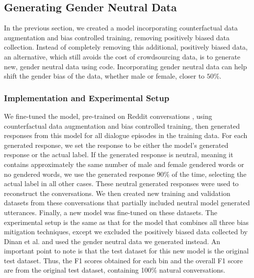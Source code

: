 \subsection{Generating Gender Neutral Data}
In the previous section, we created a model incorporating counterfactual data augmentation and bias controlled training, removing positively biased data collection. Instead of completely removing this additional, positively biased data, an alternative, which still avoids the cost of crowdsourcing data, is to generate new, gender neutral data using code. Incorporating gender neutral data can help shift the gender bias of the data, whether male or female, closer to $50\%$.

\subsubsection{Implementation and Experimental Setup}
We fine-tuned the model, pre-trained on Reddit conversations \supercite{redditmodel}, using counterfactual data augmentation and bias controlled training, then generated responses from this model for all dialogue episodes in the training data. For each generated response, we set the response to be either the model’s generated response or the actual label. If the generated response is neutral, meaning it contains approximately the same number of male and female gendered words or no gendered words, we use the generated response $90\%$ of the time, selecting the actual label in all other cases. These neutral generated responses were used to reconstruct the conversations. We then created new training and validation datasets from these conversations that partially included neutral model generated utterances. Finally, a new model was fine-tuned on these datasets. The experimental setup is the same as that for the model that combines all three bias mitigation techniques, except we excluded the positively biased data collected by Dinan et al. \supercite{dinan2020} and used the gender neutral data we generated instead. An important point to note is that the test dataset for this new model is the original test dataset. Thus, the F1 scores obtained for each bin and the overall F1 score are from the original test dataset, containing 100\% natural conversations.

